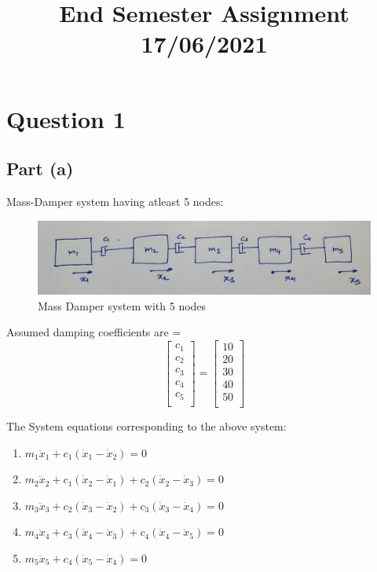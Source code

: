 \documentclass[conference]{IEEEtran}
\begin{document}
\title{End Semester Assignment\\
{\footnotesize 17/06/2021}
}

\author{
}

\maketitle

\section{Question 1}
\subsection{Part (a)}
Mass-Damper system having atleast 5 nodes:
\begin{figure}[htbp]
\centerline{\includegraphics[scale=0.2]{img11.jpeg}}
\caption{Mass Damper system with 5 nodes}
\label{fig4}
\end{figure}

Assumed damping coefficients are = 
\[
\begin{bmatrix}
    c_1\\
    c_2\\
    c_3\\
    c_4\\
    c_5\\
\end{bmatrix}
=
\begin{bmatrix}
    10\\
    20\\
    30\\
    40\\
    50\\
\end{bmatrix}
\]
\newline

The System equations corresponding to the above system:
\begin{enumerate}
    \item $ m_1\ddot x_1 + c_1(\dot x_1-\dot x_2) = 0 $
    \item $ m_2\ddot x_2 + c_1(\dot x_2-\dot x_1) + c_2(\dot x_2-\dot x_3) = 0 $
    \item $ m_3\ddot x_3 + c_2(\dot x_3-\dot x_2) + c_3(\dot x_3-\dot x_4) = 0 $
    \item $ m_4\ddot x_4 + c_3(\dot x_4-\dot x_3) + c_4(\dot x_4-\dot x_5) = 0 $
    \item $ m_5\ddot x_5 + c_4(\dot x_5-\dot x_4) = 0 $
\end{enumerate}
\end{document}
